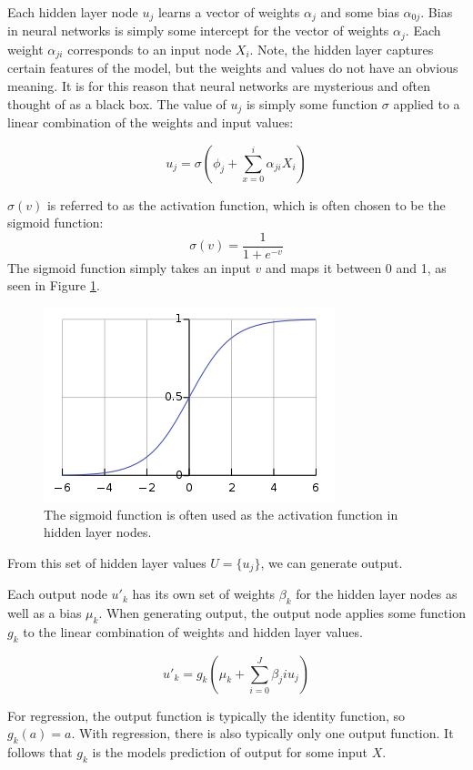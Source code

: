 \documentclass[12pt]{article}
\begin{document}
Each hidden layer node $u_j$ learns a vector of weights $\alpha_j$ and some bias $\alpha_{0j}$. Bias in neural networks is simply some intercept for the vector of weights $\alpha_j$. Each weight $\alpha_{ji}$ corresponds to an input node $X_i$. Note, the hidden layer captures certain features of the model, but the weights and values do not have an obvious meaning. It is for this reason that neural networks are mysterious and often thought of as a black box. The value of $u_j$ is simply some function $\sigma$ applied to a linear combination of the weights and input values:

$$u_j = \sigma(\phi_{j} + \sum_{x=0}^{i}\alpha_{ji} X_i)$$

$\sigma(v)$ is referred to as the activation function, which is often chosen to be the sigmoid function:
$$\sigma(v) = \frac{1}{1+e^{-v}}$$
The sigmoid function simply takes an input $v$ and maps it between 0 and 1, as seen in Figure \ref{sigmoid}. 

\begin{figure}[ht]
	\centering
	\includegraphics[width=.5\textwidth]{sigmoid.png}
	\caption{The sigmoid function is often used as the activation function in hidden layer nodes.}
	\label{sigmoid}
	
\end{figure}

From this set of hidden layer values $U = \{u_j\}$, we can generate output.

Each output node $u'_k$ has its own set of weights $\beta_k$ for the hidden layer nodes as well as a bias $\mu_k$. 
When generating output, the output node applies some function $g_k$ to the linear combination of weights and hidden layer values.

$$u'_k = g_k( \mu_k + \sum_{i=0}^{J} \beta_ji u_j)$$

For regression, the output function is typically the identity function, so $g_k(a) = a$. With regression, there is also typically only one output function. It follows that $g_k$ is the models prediction of output for some input $X$.\cite[350-351]{springer}
\end{document}
